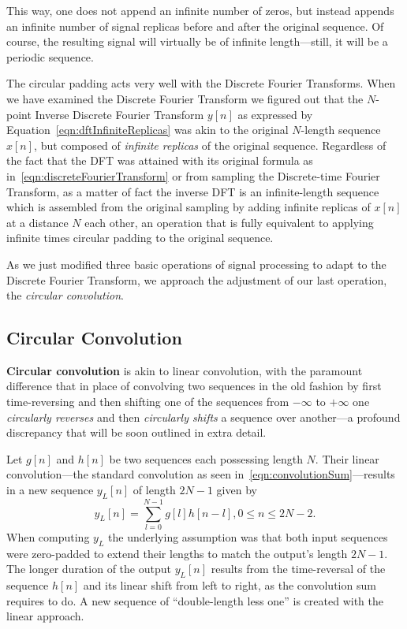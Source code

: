 \documentclass[\documentfontsize, twocolumn]{\classname}
\begin{document}
This way, one does not append an infinite number of zeros, but instead appends an infinite number of signal replicas before and after the original sequence. Of course, the resulting signal will virtually be of infinite length---still, it will be a periodic sequence.

The circular padding acts very well with the Discrete Fourier Transforms. When we have examined the Discrete Fourier Transform we figured out that the $N$-point Inverse Discrete Fourier Transform $y[n]$ as expressed by Equation~\ref{eqn:dftInfiniteReplicas} was akin to the original $N$-length sequence $x[n]$, but composed of \emph{infinite replicas} of the original sequence. Regardless of the fact that the DFT was attained with its original formula as in~\ref{eqn:discreteFourierTransform} or from sampling the Discrete-time Fourier Transform, as a matter of fact the inverse DFT is an infinite-length sequence which is assembled from the original sampling by adding infinite replicas of $x[n]$ at a distance $N$ each other, an operation that is fully equivalent to applying infinite times circular padding to the original sequence.

As we just modified three basic operations of signal processing to adapt to the Discrete Fourier Transform, we approach the adjustment of our last operation, the \emph{circular convolution}.

\subsection{Circular Convolution}

\textbf{Circular convolution} is akin to linear convolution, with the paramount difference that in place of convolving two sequences in the old fashion by first time-reversing and then shifting one of the sequences from $-\infty$ to $+\infty$ one \emph{circularly reverses} and then \emph{circularly shifts} a sequence over another---a profound discrepancy that will be soon outlined in extra detail.

Let $g[n]$ and $h[n]$ be two sequences each possessing length $N$. Their linear convolution---the standard convolution as seen in~\ref{eqn:convolutionSum}---results in a new sequence $y_L[n]$ of length $2N-1$ given by
\[
    y_L[n] = \sum_{l=0}^{N-1} g[l] h[n-l], 0 \leq n \leq 2N-2.
\]
When computing $y_L$ the underlying assumption was that both input sequences were zero-padded to extend their lengths to match the output's length $2N-1$. The longer duration of the output $y_L[n]$ results from the time-reversal of the sequence $h[n]$ and its linear shift from left to right, as the convolution sum requires to do. A new sequence of ``double-length less one'' is created with the linear approach.
\end{document}
